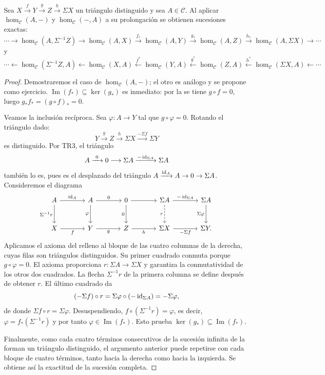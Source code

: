 \begin{prop}\label{prop:exacta}
Sea $X\xrightarrow{f}Y\xrightarrow{g}Z\xrightarrow{h}\Sigma X$ un triángulo distinguido y sea $A\in\mathcal C$. Al aplicar $\hom_{\mathcal C}(A,-)$ y $\hom_{\mathcal C}(-,A)$ a su prolongación se obtienen sucesiones exactas:
\[
\cdots\to{}\hom_{\mathcal C}(A,\Sigma^{-1}Z)\to
\hom_{\mathcal C}(A,X)\xrightarrow{f_*}\hom_{\mathcal C}(A,Y)
\xrightarrow{g_*}\hom_{\mathcal C}(A,Z)\xrightarrow{h_*}\hom_{\mathcal C}(A,\Sigma X)\to\cdots
\]
y
\[
\cdots\leftarrow\hom_{\mathcal C}(\Sigma^{-1}Z,A)\leftarrow
\hom_{\mathcal C}(X,A)\xleftarrow{f^*}\hom_{\mathcal C}(Y,A)
\xleftarrow{g^*}\hom_{\mathcal C}(Z,A)
\xleftarrow{h^*}\hom_{\mathcal C}(\Sigma X,A)\leftarrow\cdots
\]
\end{prop}
\begin{proof}
Demostraremos el caso de $\hom_{\mathcal C}(A,-)$; el otro es análogo y se propone como ejercicio.
$\operatorname{Im}(f_*)\subseteq\ker(g_*)$ es inmediato: por la  se tiene $g\circ f=0$, luego $g_*f_*=(g\circ f)_*=0$.

Veamos la inclusión recíproca. Sea $\varphi\colon A\to Y$ tal que $g\circ\varphi=0$. Rotando el triángulo dado:
\[
Y\xrightarrow{\ g\ }Z\xrightarrow{\ h\ }\Sigma X\xrightarrow{-\Sigma f}\Sigma Y
\]
es distinguido. Por \textup{TR3}, el triángulo
\[
A\xrightarrow{\ 0\ }0\longrightarrow\Sigma A\xrightarrow{-\operatorname{id}_{\Sigma A}}\Sigma A
\]
también lo es, pues es el desplazado del triángulo $A\xrightarrow{\operatorname{id}_A}A\to0\to\Sigma A$. Consideremos el diagrama
\[
\begin{tikzcd}[column sep=large, row sep=large]
A \arrow[r,"\id_A"] \arrow[d,"\Sigma^{-1}r"'] & A \arrow[r,"0"] \arrow[d,"\varphi"'] & 0 \arrow[r] \arrow[d,"0"'] & \Sigma A \arrow[r,"-\id_{\Sigma A}"] \arrow[d,dashed,"r"'] & \Sigma A \arrow[d,"\Sigma\varphi"']\\
X \arrow[r,"f"'] & Y \arrow[r,"g"'] & Z \arrow[r,"h"'] & \Sigma X \arrow[r,"-\Sigma f"'] & \Sigma Y .
\end{tikzcd}
\]
Aplicamos el axioma del relleno al bloque de las cuatro columnas de la derecha, cuyas filas son triángulos distinguidos. Su primer cuadrado conmuta porque $g\circ\varphi=0$. El axioma proporciona $r\colon\Sigma A\to\Sigma X$ y garantiza la conmutatividad de los otros dos cuadrados. La flecha $\Sigma^{-1}r$ de la primera columna se define después de obtener $r$. El último cuadrado da
\[
(-\Sigma f)\circ r=\Sigma\varphi\circ(-\operatorname{id}_{\Sigma A})=-\Sigma\varphi,
\]
de donde $\Sigma f\circ r=\Sigma\varphi$. Desuspendiendo, $f\circ(\Sigma^{-1}r)=\varphi$, es decir, $\varphi=f_*(\Sigma^{-1}r)$ y por tanto $\varphi\in\operatorname{Im}(f_*)$. Esto prueba $\ker(g_*)\subseteq\operatorname{Im}(f_*)$.

Finalmente, como cada cuatro términos consecutivos de la sucesión infinita de la  forman un triángulo distinguido, el argumento anterior puede repetirse con cada bloque de cuatro términos, tanto hacia la derecha como hacia la izquierda. Se obtiene así la exactitud de la sucesión completa.
\end{proof}

